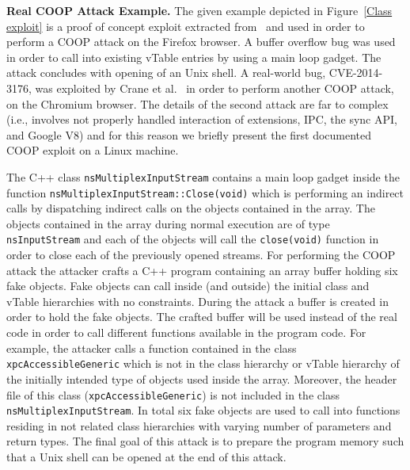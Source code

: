 \textbf{Real COOP Attack Example.}
\label{Running Example: CVE X}
The given example depicted in Figure~\ref{Class exploit}
is a proof of concept exploit extracted from~\cite{schuster:coop} and used in order to perform 
a COOP attack on the Firefox browser. A buffer overflow bug was used in order to call 
into existing vTable entries by using a main loop gadget. 
The attack concludes with opening of an Unix shell. 
A real-world bug, CVE-2014-3176, was exploited by Crane et al.~\cite{crane:readactor++}
in order to perform another COOP attack, on the Chromium browser. The details of the 
second attack are far to complex (i.e., involves not properly handled interaction of 
extensions, IPC, the sync API, and Google V8) and for this reason we briefly present the first 
documented COOP exploit on a Linux machine.

The C++ class \texttt{nsMultiplexInputStream} contains a main loop gadget inside the function 
\texttt{nsMultiplexInputStream::Close(void)} which is performing an indirect calls by dispatching
indirect calls on the objects contained in the array. 
The objects contained in the array during normal execution are of type \texttt{nsInputStream} and each
of the objects will call the \texttt{close(void)} function in order to close each of the previously opened streams.
For performing the COOP attack the attacker crafts a C++ program containing an array buffer holding 
six fake objects. Fake objects can call inside (and outside) the initial class and vTable hierarchies
with no constraints.
During the attack a buffer is created in order to hold the fake objects.
The crafted buffer will be used instead of the real code in order to call different functions
available in the program code. For example, the attacker calls a function contained in the class
\texttt{xpcAccessibleGeneric} which is not in the class hierarchy or vTable hierarchy
of the initially intended type of objects used inside the array.
Moreover, the header file of this class (\texttt{xpcAccessibleGeneric}) is not included in the 
class \texttt{nsMultiplexInputStream}.
In total six fake objects are used to call into functions residing in not related class hierarchies with varying 
number of parameters and return types. The final goal of this attack is to prepare the program memory such 
that a Unix shell can be opened at the end of this attack.

